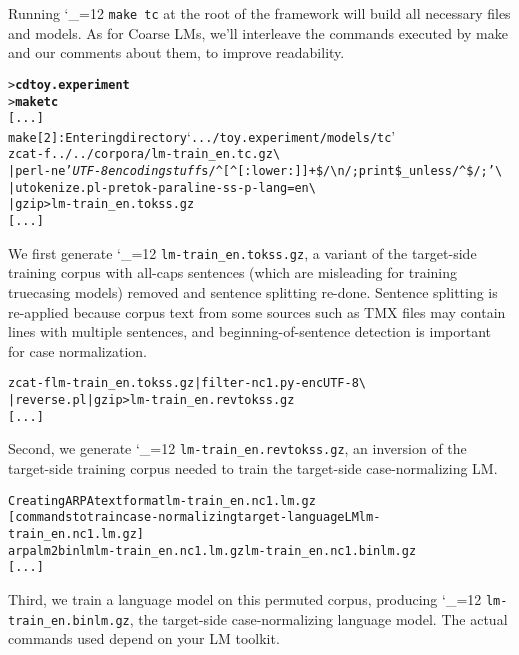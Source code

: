 \documentclass[11pt,letterpaper]{article}
\newcommand{\bs}{\textbackslash{}}
\newcommand{\TODO}[1]{\emph{\textbf{\textcolor{red}{<TODO> #1 </TODO>}}}}
\def\code{\begingroup\catcode`\_=12 \codex}
\newcommand{\codex}[1]{\texttt{#1}\endgroup}
\begin{document}

Running \code{make tc} at the root of the framework will build all necessary
files and models.  As for Coarse LMs, we'll
interleave the commands executed by make and our comments about them, to
improve readability.

\begin{small}
\begin{alltt}
   > \textbf{cd toy.experiment}
   > \textbf{make tc}
   [...]
   make[2]: Entering directory `.../toy.experiment/models/tc'
   zcat -f ../../corpora/lm-train_en.tc.gz \bs
        | perl -ne '\emph{UTF-8 encoding stuff} s/^[^[:lower:]]+\$/{\bs}n/; print \$_ unless /^\$/;' \bs
        | utokenize.pl -pretok -paraline -ss -p -lang=en \bs
        | gzip > lm-train_en.tokss.gz
   [...]
\end{alltt}
\end{small}

We first generate \code{lm-train_en.tokss.gz}, a variant of the target-side
training corpus with all-caps sentences (which are misleading for training
truecasing models) removed and sentence splitting re-done.  Sentence splitting
is re-applied because corpus text from some sources such as TMX files may
contain lines with multiple sentences, and beginning-of-sentence detection is
important for case normalization.

\begin{small}
\begin{alltt}
   zcat -f lm-train_en.tokss.gz | filter-nc1.py -enc UTF-8 \bs
        | reverse.pl | gzip > lm-train_en.revtokss.gz
   [...]
\end{alltt}
\end{small}

Second, we generate \code{lm-train_en.revtokss.gz}, an inversion of the
target-side training corpus needed to train the target-side case-normalizing
LM.

\begin{small}
\begin{alltt}
   Creating ARPA text format lm-train_en.nc1.lm.gz
   [commands to train case-normalizing target-language LM lm-train_en.nc1.lm.gz]
   arpalm2binlm lm-train_en.nc1.lm.gz lm-train_en.nc1.binlm.gz
   [...]
\end{alltt}
\end{small}

Third, we train a language model on this permuted corpus, producing
\code{lm-train_en.binlm.gz}, the target-side case-normalizing language model.
The actual commands used depend on your LM toolkit.
\end{document}
